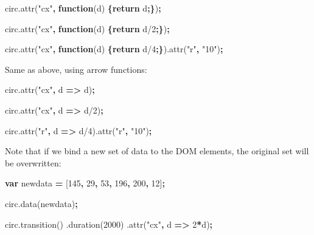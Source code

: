 \documentclass[openany]{book}
\newenvironment{Shaded}{\begin{snugshade}}{\end{snugshade}}
\newcommand{\AttributeTok}[1]{\textcolor[rgb]{0.77,0.63,0.00}{#1}}
\newcommand{\ControlFlowTok}[1]{\textcolor[rgb]{0.13,0.29,0.53}{\textbf{#1}}}
\newcommand{\DecValTok}[1]{\textcolor[rgb]{0.00,0.00,0.81}{#1}}
\newcommand{\KeywordTok}[1]{\textcolor[rgb]{0.13,0.29,0.53}{\textbf{#1}}}
\newcommand{\NormalTok}[1]{#1}
\newcommand{\OperatorTok}[1]{\textcolor[rgb]{0.81,0.36,0.00}{\textbf{#1}}}
\newcommand{\StringTok}[1]{\textcolor[rgb]{0.31,0.60,0.02}{#1}}
\newcommand{\VariableTok}[1]{\textcolor[rgb]{0.00,0.00,0.00}{#1}}
\begin{document}
\begin{Shaded}
\begin{Highlighting}[]
\VariableTok{circ}\NormalTok{.}\AttributeTok{attr}\NormalTok{(}\StringTok{"cx"}\OperatorTok{,} \KeywordTok{function}\NormalTok{(d) }\OperatorTok{\{}\ControlFlowTok{return}\NormalTok{ d}\OperatorTok{;\}}\NormalTok{)}\OperatorTok{;}

\VariableTok{circ}\NormalTok{.}\AttributeTok{attr}\NormalTok{(}\StringTok{"cx"}\OperatorTok{,} \KeywordTok{function}\NormalTok{(d) }\OperatorTok{\{}\ControlFlowTok{return}\NormalTok{ d/}\DecValTok{2}\OperatorTok{;\}}\NormalTok{)}\OperatorTok{;}

\VariableTok{circ}\NormalTok{.}\AttributeTok{attr}\NormalTok{(}\StringTok{"cx"}\OperatorTok{,} \KeywordTok{function}\NormalTok{(d) }\OperatorTok{\{}\ControlFlowTok{return}\NormalTok{ d/}\DecValTok{4}\OperatorTok{;\}}\NormalTok{).}\AttributeTok{attr}\NormalTok{(}\StringTok{"r"}\OperatorTok{,} \StringTok{"10"}\NormalTok{)}\OperatorTok{;}
\end{Highlighting}
\end{Shaded}

Same as above, using arrow functions:

\begin{Shaded}
\begin{Highlighting}[]
\VariableTok{circ}\NormalTok{.}\AttributeTok{attr}\NormalTok{(}\StringTok{"cx"}\OperatorTok{,}\NormalTok{ d }\OperatorTok{=>}\NormalTok{ d)}\OperatorTok{;}

\VariableTok{circ}\NormalTok{.}\AttributeTok{attr}\NormalTok{(}\StringTok{"cx"}\OperatorTok{,}\NormalTok{ d }\OperatorTok{=>}\NormalTok{ d/}\DecValTok{2}\NormalTok{)}\OperatorTok{;}

\VariableTok{circ}\NormalTok{.}\AttributeTok{attr}\NormalTok{(}\StringTok{"r"}\OperatorTok{,}\NormalTok{ d }\OperatorTok{=>}\NormalTok{ d/}\DecValTok{4}\NormalTok{).}\AttributeTok{attr}\NormalTok{(}\StringTok{"r"}\OperatorTok{,} \StringTok{"10"}\NormalTok{)}\OperatorTok{;}
\end{Highlighting}
\end{Shaded}

Note that if we bind a new set of data to the DOM elements, the original set will be overwritten:

\begin{Shaded}
\begin{Highlighting}[]
\KeywordTok{var}\NormalTok{ newdata }\OperatorTok{=}\NormalTok{ [}\DecValTok{145}\OperatorTok{,} \DecValTok{29}\OperatorTok{,} \DecValTok{53}\OperatorTok{,} \DecValTok{196}\OperatorTok{,} \DecValTok{200}\OperatorTok{,} \DecValTok{12}\NormalTok{]}\OperatorTok{;}

\VariableTok{circ}\NormalTok{.}\AttributeTok{data}\NormalTok{(newdata)}\OperatorTok{;}

\VariableTok{circ}\NormalTok{.}\AttributeTok{transition}\NormalTok{()}
\NormalTok{    .}\AttributeTok{duration}\NormalTok{(}\DecValTok{2000}\NormalTok{)}
\NormalTok{    .}\AttributeTok{attr}\NormalTok{(}\StringTok{"cx"}\OperatorTok{,}\NormalTok{ d }\OperatorTok{=>} \DecValTok{2}\OperatorTok{*}\NormalTok{d)}\OperatorTok{;}
\end{Highlighting}
\end{Shaded}
\end{document}
